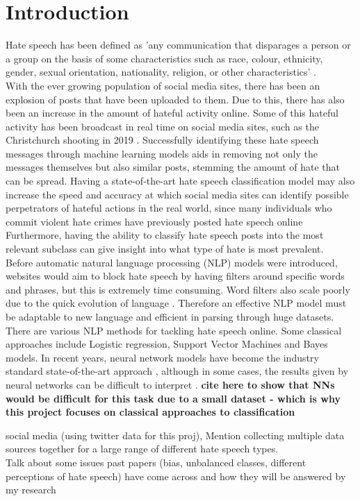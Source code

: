 \documentclass[conference]{IEEEtran}
\begin{document}
\section{Introduction}
Hate speech has been defined as 'any communication that disparages a person or a group on the basis of some characteristics such as race, colour, ethnicity, gender, sexual orientation, nationality, religion, or other characteristics' \cite{b1}. \\
With the ever growing population of social media sites, there has been an explosion of posts that have been uploaded to them. Due to this, there has also been an increase in the amount of hateful activity online. Some of this hateful activity has been broadcast in real time on social media sites, such as the Christchurch shooting in 2019 \cite{b6}. Successfully identifying these hate speech messages through machine learning models aids in removing not only the messages themselves but also similar posts, stemming the amount of hate that can be spread. Having a state-of-the-art hate speech classification model may also increase the speed and accuracy at which social media sites can identify possible perpetrators of hateful actions in the real world, since many individuals who commit violent hate crimes have previously posted hate speech online \cite{b7} Furthermore, having the ability to classify hate speech posts into the most relevant subclass can give insight into what type of hate is most prevalent.\\
Before automatic natural language processing (NLP) models were introduced, websites would aim to block hate speech by having filters around specific words and phrases, but this is extremely time consuming. Word filters also scale poorly due to the quick evolution of language \cite{b2, b3}. Therefore an effective NLP model must be adaptable to new language and efficient in parsing through huge datasets. \\
There are various NLP methods for tackling hate speech online. Some classical approaches include Logistic regression, Support Vector Machines and Bayes models. In recent years, neural network models have become the industry standard state-of-the-art approach \cite{b4}, although in some cases, the results given by neural networks can be difficult to interpret \cite{b5}. \textbf{cite here to show that NNs would be difficult for this task due to a small dataset - which is why this project focuses on classical approaches to classification}

social media (using twitter data for this proj), Mention collecting multiple data sources together for a large range of different hate speech types.\\ Talk about some issues past papers (bias, unbalanced classes, different perceptions of hate speech) have come across and how they will be answered by my research
\end{document}
